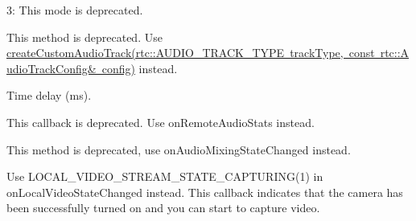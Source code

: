 \begin{DoxyRefList}
\label{deprecated__deprecated000013}%
%
 3\+: This mode is deprecated.  
\item[Member \mbox{\hyperlink{classagora_1_1media_1_1_i_media_engine_a9d8ffc684390f54f2258ddad1a8b69c8}{agora\+::media\+::I\+Media\+Engine\+::set\+External\+Audio\+Source}} (bool enabled, int sample\+Rate, int channels, bool local\+Playback=false, bool publish=true) \+\_\+\+\_\+deprecated=0]\label{deprecated__deprecated000014}%
%
This method is deprecated. Use \mbox{\hyperlink{classagora_1_1media_1_1_i_media_engine_adb9b0203cf06756db5357ea806058ab0}{create\+Custom\+Audio\+Track(rtc\+::\+A\+U\+D\+I\+O\+\_\+\+T\+R\+A\+C\+K\+\_\+\+T\+Y\+P\+E track\+Type, const rtc\+::\+Audio\+Track\+Config\& config)}} instead. 
\item[Member \mbox{\hyperlink{structagora_1_1rtc_1_1_remote_video_stats_a0a0f8269be3dfe782aa5d0cf7dc074f0}{agora\+::rtc\+::Remote\+Video\+Stats\+::\+\_\+\+\_\+deprecated}} ]\label{deprecated__deprecated000015}%
%
Time delay (ms). 
\item[Member \mbox{\hyperlink{classagora_1_1rtc_1_1_i_rtc_engine_event_handler_ab612312f6b4f72e1a036ef7683b8d324}{agora\+::rtc\+::I\+Rtc\+Engine\+Event\+Handler\+::on\+Audio\+Quality}} (uid\+\_\+t uid, int quality, unsigned short delay, unsigned short lost) \+\_\+\+\_\+deprecated]\label{deprecated__deprecated000016}%
%
This callback is deprecated. Use on\+Remote\+Audio\+Stats instead. 
\item[Member \mbox{\hyperlink{classagora_1_1rtc_1_1_i_rtc_engine_event_handler_a844b1585ecc0c86471d7dd5a462eaaf3}{agora\+::rtc\+::I\+Rtc\+Engine\+Event\+Handler\+::on\+Audio\+Mixing\+Finished}} () \+\_\+\+\_\+deprecated]\label{deprecated__deprecated000017}%
%
This method is deprecated, use on\+Audio\+Mixing\+State\+Changed instead. 
\item[Member \mbox{\hyperlink{classagora_1_1rtc_1_1_i_rtc_engine_event_handler_a630b63e8df71ab9f19a96b425fce7c94}{agora\+::rtc\+::I\+Rtc\+Engine\+Event\+Handler\+::on\+Camera\+Ready}} () \+\_\+\+\_\+deprecated]\label{deprecated__deprecated000018}%
%
Use {\ttfamily L\+O\+C\+A\+L\+\_\+\+V\+I\+D\+E\+O\+\_\+\+S\+T\+R\+E\+A\+M\+\_\+\+S\+T\+A\+T\+E\+\_\+\+C\+A\+P\+T\+U\+R\+I\+N\+G(1)} in on\+Local\+Video\+State\+Changed instead. This callback indicates that the camera has been successfully turned on and you can start to capture video. 
\end{DoxyRefList}